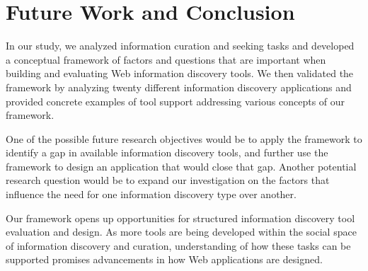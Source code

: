 \documentclass{casconpaper}
\begin{document}
{\section{ Future Work and Conclusion }
In our study, we analyzed information curation and seeking tasks and developed a conceptual framework of factors and questions that are important when building and evaluating Web information discovery tools. We then validated the framework by analyzing twenty different information discovery applications and provided concrete examples of tool support addressing various concepts of our framework.

One of the possible future research objectives would be to apply the framework to identify a gap in available information discovery tools, and further use the framework to design an application that would close that gap. Another potential research question would be to expand our investigation on the factors that influence the need for one information discovery type over another. 

Our framework opens up opportunities for structured information discovery tool evaluation and design. As more tools are being developed within the social space of information discovery and curation, understanding of how these tasks can be supported promises advancements in how Web applications are designed.

} %
\end{document}
